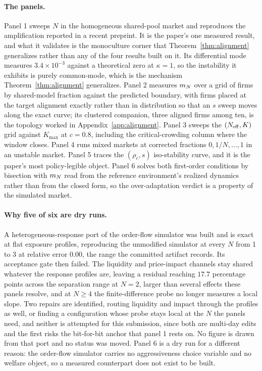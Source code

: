 \paragraph{The panels.} Panel 1 sweeps $N$ in the homogeneous shared-pool market and reproduces the amplification reported in a recent preprint. It is the paper's one measured result, and what it validates is the monoculture corner that Theorem~\ref{thm:alignment} generalizes rather than any of the four results built on it. Its differential mode measures $3.4\times 10^{-3}$ against a theoretical zero at $\kappa=1$, so the instability it exhibits is purely common-mode, which is the mechanism Theorem~\ref{thm:alignment} generalizes. Panel 2 measures $m_N$ over a grid of firms by shared-model fraction against the predicted boundary, with firms placed at the target alignment exactly rather than in distribution so that an $s$ sweep moves along the exact curve; its clustered companion, three aligned firms among ten, is the topology worked in Appendix~\ref{app:alignment}. Panel 3 sweeps the $(N_{\mathrm{eff}}, K)$ grid against $K_{\max}$ at $c = 0.8$, including the critical-crowding column where the window closes. Panel 4 runs mixed markets at corrected fractions $0, 1/N, \ldots, 1$ in an unstable market. Panel 5 traces the $(\rho_c, s)$ iso-stability curve, and it is the paper's most policy-legible object. Panel 6 solves both first-order conditions by bisection with $m_N$ read from the reference environment's realized dynamics rather than from the closed form, so the over-adaptation verdict is a property of the simulated market.

\paragraph{Why five of six are dry runs.} A heterogeneous-response port of the order-flow simulator was built and is exact at flat exposure profiles, reproducing the unmodified simulator at every $N$ from 1 to 3 at relative error $0.00$, the range the committed artifact records. Its acceptance gate then failed. The liquidity and price-impact channels stay shared whatever the response profiles are, leaving a residual reaching $17.7$ percentage points across the separation range at $N=2$, larger than several effects these panels resolve, and at $N \geq 4$ the finite-difference probe no longer measures a local slope. Two repairs are identified, routing liquidity and impact through the profiles as well, or finding a configuration whose probe stays local at the $N$ the panels need, and neither is attempted for this submission, since both are multi-day edits and the first risks the bit-for-bit anchor that panel 1 rests on. No figure is drawn from that port and no status was moved. Panel 6 is a dry run for a different reason: the order-flow simulator carries no aggressiveness choice variable and no welfare object, so a measured counterpart does not exist to be built.

